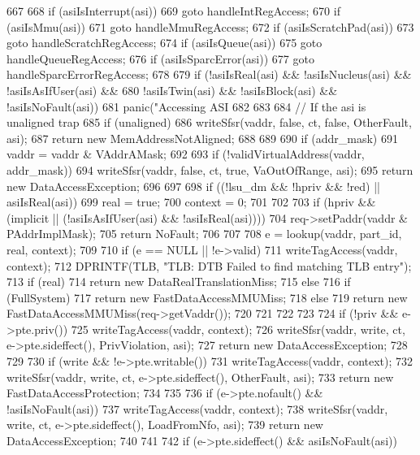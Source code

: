 \begin{DoxyCode}
{{667 
668         if (asiIsInterrupt(asi))
669             goto handleIntRegAccess;
670         if (asiIsMmu(asi))
671             goto handleMmuRegAccess;
672         if (asiIsScratchPad(asi))
673             goto handleScratchRegAccess;
674         if (asiIsQueue(asi))
675             goto handleQueueRegAccess;
676         if (asiIsSparcError(asi))
677             goto handleSparcErrorRegAccess;
678 
679         if (!asiIsReal(asi) && !asiIsNucleus(asi) && !asiIsAsIfUser(asi) &&
680                 !asiIsTwin(asi) && !asiIsBlock(asi) && !asiIsNoFault(asi))
681             panic("Accessing ASI %
682     }
683 
684     // If the asi is unaligned trap
685     if (unaligned) {
686         writeSfsr(vaddr, false, ct, false, OtherFault, asi);
687         return new MemAddressNotAligned;
688     }
689 
690     if (addr_mask)
691         vaddr = vaddr & VAddrAMask;
692 
693     if (!validVirtualAddress(vaddr, addr_mask)) {
694         writeSfsr(vaddr, false, ct, true, VaOutOfRange, asi);
695         return new DataAccessException;
696     }
697 
698     if ((!lsu_dm && !hpriv && !red) || asiIsReal(asi)) {
699         real = true;
700         context = 0;
701     }
702 
703     if (hpriv && (implicit || (!asiIsAsIfUser(asi) && !asiIsReal(asi)))) {
704         req->setPaddr(vaddr & PAddrImplMask);
705         return NoFault;
706     }
707 
708     e = lookup(vaddr, part_id, real, context);
709 
710     if (e == NULL || !e->valid) {
711         writeTagAccess(vaddr, context);
712         DPRINTF(TLB, "TLB: DTB Failed to find matching TLB entry\n");
713         if (real) {
714             return new DataRealTranslationMiss;
715         } else {
716             if (FullSystem)
717                 return new FastDataAccessMMUMiss;
718             else
719                 return new FastDataAccessMMUMiss(req->getVaddr());
720         }
721 
722     }
723 
724     if (!priv && e->pte.priv()) {
725         writeTagAccess(vaddr, context);
726         writeSfsr(vaddr, write, ct, e->pte.sideffect(), PrivViolation, asi);
727         return new DataAccessException;
728     }
729 
730     if (write && !e->pte.writable()) {
731         writeTagAccess(vaddr, context);
732         writeSfsr(vaddr, write, ct, e->pte.sideffect(), OtherFault, asi);
733         return new FastDataAccessProtection;
734     }
735 
736     if (e->pte.nofault() && !asiIsNoFault(asi)) {
737         writeTagAccess(vaddr, context);
738         writeSfsr(vaddr, write, ct, e->pte.sideffect(), LoadFromNfo, asi);
739         return new DataAccessException;
740     }
741 
742     if (e->pte.sideffect() && asiIsNoFault(asi)) {
}}
\end{DoxyCode}
